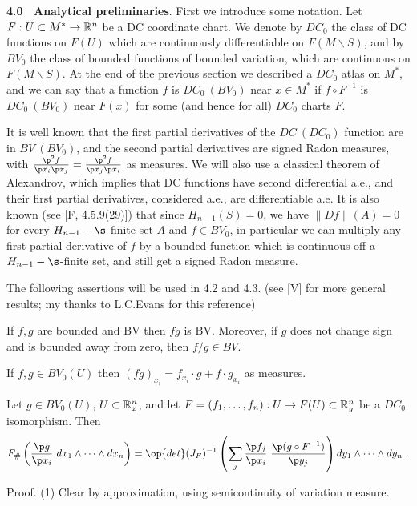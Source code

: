 \bigskip
{}\endspecialhead

{\bf 4.0 \ Analytical preliminaries}. First we introduce some notation.
Let $F: U\subset M^*\to\Bbb R^n$ be a DC coordinate chart. We denote by
$DC_0$ the
class of DC functions on $F(U)$ which are continuously differentiable on
$F(M\backslash S)$, and by $BV_0$ the class of bounded functions of bounded
variation, which are continuous on $F(M\backslash S)$. At the end of the
previous
section we described a $DC_0$ atlas on $M^*$, and we can say that a
function $f$ is
$DC_0 \ (BV_0)$ near $x\in M^*$ if $f\circ F^{-1}$ is $DC_0 \ (BV_0)$ near
$F(x)$
for some (and hence for all) $DC_0$ charts $F$.

It is well known that the first partial derivatives of the $DC \ (DC_0)$
function
are in $BV \ (BV_0)$, and the second partial derivatives are signed Radon
measures,
with $\frac{\p^2 f}{\p x_i\p x_j} =\frac{\p^2 f}{\p x_j \p x_i}$ as measures.
We will also use a classical theorem of Alexandrov, which implies that DC
functions
have second differential a.e., and their first partial derivatives,
considered a.e.,
are differentiable a.e. It is also known (see [F, 4.5.9(29)]) that since
$H_{n-1}(S)=0$, we have $\|Df\|(A)=0$ for every $H_{n-1}-\s$-finite set $A$ and
$f\in BV_0$, in particular we can multiply any first partial derivative of
$f$ by a
bounded function which is continuous off a $H_{n-1}-\s$-finite set, and
still get
a signed Radon measure.

The following assertions will be used in 4.2 and 4.3. (see [V] for more general
results; my thanks to L.C.Evans for this reference)

\roster
\item If $f,g$ are bounded and BV then $fg$ is BV. Moreover, if $g$ does not
change sign and is bounded away from zero, then $f/g\in BV$.
\item If $f,g\in BV_0(U)$  then $(fg)_{x_i}=f_{x_i}\cdot g+
f\cdot g_{x_i}$ as measures.
\item Let $g\in BV_0(U)$, $U\subset\Bbb R^n_x$, and let
$F=(f_1,\dots ,f_n):U\to F(U)\subset\Bbb R^n_y$ be a $DC_0$ isomorphism. Then
$$
F_\#\left( \frac{\p g}{\p x_i} \ dx_1\wedge\dots\wedge dx_n\right) =
{\op{det}}(J_F)^{-1} \left( \sum_j
\frac{\p f_j}{\p x_i} \ \frac{\p(g\circ F^{-1})}{\p y_j}\right)
dy_1\wedge\dots\wedge dy_n \ .
$$
\endroster
\endproclaim

{\smc Proof}. (1) Clear by approximation, using semicontinuity of variation
measure.

